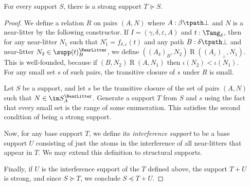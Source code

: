\begin{proposition}
  \label{prop:exists_strong}
  \leanok
  For every support \( S \), there is a strong support \( T \succeq S \).
\end{proposition}
\begin{proof}
  \leanok
  We define a relation \( R \) on pairs \( (A, N) \) where \( A : \beta \tpath \bot \) and \( N \) is a near-litter by the following constructor.
  If \( I = (\gamma,\delta,\varepsilon,A) \) and \( t : \Tang_\delta \), then for any near-litter \( N_1 \) such that \( N_1^\circ = f_{\delta,\varepsilon}(t) \) and any path \( B : \delta \tpath \bot \) and near-litter \( N_2 \in \supp(t)_B^\NearLitter \), we define \( ((A_\delta)_B, N_2) \mathrel{R} ((A_\varepsilon)_\bot, N_1) \).
  This is well-founded, because if \( (B, N_2) \mathrel{R} (A, N_1) \) then \( \iota(N_2) < \iota(N_1) \).
  For any small set \( s \) of such pairs, the transitive closure of \( s \) under \( R \) is small.

  Let \( S \) be a support, and let \( s \) be the transitive closure of the set of pairs \( (A, N) \) such that \( N \in \im S_A^\NearLitter \).
  Generate a support \( T \) from \( S \) and \( s \) using the fact that every small set is the range of some enumeration.
  This satisfies the second condition of being a strong support.

  Now, for any base support \( T \), we define its \emph{interference support} to be a base support \( U \) consisting of just the atoms in the interference of all near-litters that appear in \( T \).
  We may extend this definition to structural supports.

  Finally, if \( U \) is the interference support of the \( T \) defined above, the support \( T + U \) is strong, and since \( S \succeq T \), we conclude \( S \preceq T + U \).
\end{proof}

